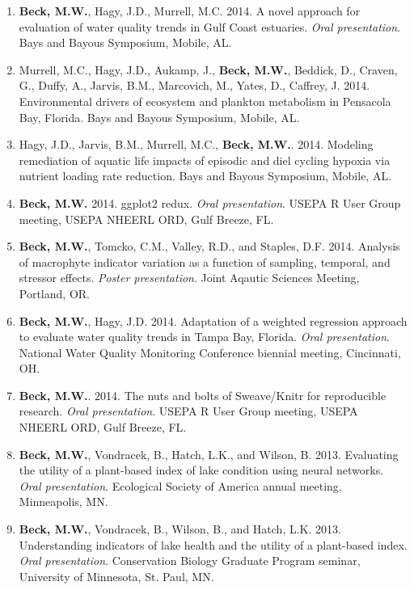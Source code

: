 \documentclass[letterpaper,12pt]{article}
\begin{document}
\begin{enumerate}
\item {\bf Beck, M.W.}, Hagy, J.D., Murrell, M.C. 2014. A novel approach for evaluation of water quality trends in Gulf Coast estuaries. \textit{Oral presentation}. Bays and Bayous Symposium, Mobile, AL.

\item Murrell, M.C., Hagy, J.D., Aukamp, J., {\bf Beck, M.W.}, Beddick, D., Craven, G., Duffy, A., Jarvis, B.M., Marcovich, M., Yates, D., Caffrey, J. 2014. Environmental drivers of ecosystem and plankton metabolism in Pensacola Bay, Florida. Bays and Bayous Symposium, Mobile, AL. 

\item Hagy, J.D., Jarvis, B.M., Murrell, M.C., {\bf Beck, M.W.}. 2014. Modeling remediation of aquatic life impacts of episodic and diel cycling hypoxia via nutrient loading rate reduction. Bays and Bayous Symposium, Mobile, AL. 

\item {\bf Beck, M.W.} 2014. ggplot2 redux. \textit{Oral presentation}. USEPA R User Group meeting, USEPA NHEERL ORD, Gulf Breeze, FL.

\item {\bf Beck, M.W.}, Tomcko, C.M., Valley, R.D., and Staples, D.F. 2014. Analysis of macrophyte indicator variation as a function of sampling, temporal, and stressor effects. \textit{Poster presentation}. Joint Aqautic Sciences Meeting, Portland, OR.

\item {\bf Beck, M.W.}, Hagy, J.D. 2014. Adaptation of a weighted regression approach to evaluate water quality trends in {T}ampa {B}ay, {F}lorida. \textit{Oral presentation}. National Water Quality Monitoring Conference biennial meeting, Cincinnati, OH.

\item {\bf Beck, M.W.}. 2014. The nuts and bolts of Sweave/Knitr for reproducible research. \textit{Oral presentation}. USEPA R User Group meeting, USEPA NHEERL ORD, Gulf Breeze, FL.

\item {\bf Beck, M.W.}, Vondracek, B., Hatch, L.K., and Wilson, B. 2013. Evaluating the utility of a plant-based index of lake condition using neural networks. \textit{Oral presentation}. Ecological Society of America annual meeting, Minneapolis, MN.

\item {\bf Beck, M.W.}, Vondracek, B., Wilson, B., and Hatch, L.K. 2013. Understanding indicators of lake health and the utility of a plant-based index. \textit{Oral presentation}. Conservation Biology Graduate Program seminar, University of Minnesota, St. Paul, MN.


\end{enumerate}
\end{document}
